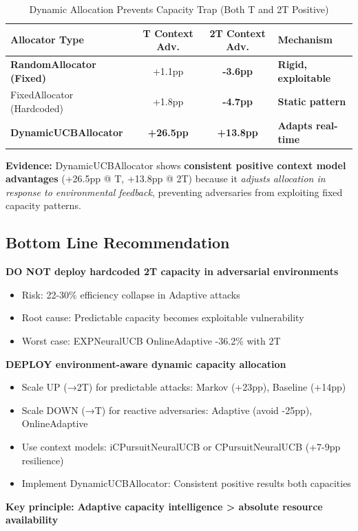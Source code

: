 \documentclass[11pt,a4paper]{article}
\newcommand{\critical}[1]{\textcolor{criticalcolor}{\textbf{#1}}}
\newcommand{\success}[1]{\textcolor{successcolor}{\textbf{#1}}}
\begin{document}
\vspace{-0.4cm}
\begin{table}[h]
\scriptsize
\centering
\begin{tabular}{lccl}
\toprule
\textbf{Allocator Type} & \textbf{T Context Adv.} & \textbf{2T Context Adv.} & \textbf{Mechanism} \\
\midrule
\critical{RandomAllocator (Fixed)} & +1.1pp & \critical{-3.6pp} & \critical{Rigid, exploitable} \\
FixedAllocator (Hardcoded) & +1.8pp & \critical{-4.7pp} & \critical{Static pattern} \\
\success{DynamicUCBAllocator} & \success{+26.5pp} & \success{+13.8pp} & \success{Adapts real-time} \\
\bottomrule
\end{tabular}
\vspace{-0.2cm}
\caption{Dynamic Allocation Prevents Capacity Trap (Both T and 2T Positive)}
\end{table}

\vspace{-0.2cm}
\textbf{Evidence:} DynamicUCBAllocator shows \success{consistent positive context model advantages} (+26.5pp @ T, +13.8pp @ 2T) because it \textit{adjusts allocation in response to environmental feedback}, preventing adversaries from exploiting fixed capacity patterns.

\subsection{Bottom Line Recommendation}

\begin{tcolorbox}
[colback=criticalcolor!10,colframe=criticalcolor,title=Critical Production Guidance]
\scriptsize
\textbf{DO NOT deploy hardcoded 2T capacity in adversarial environments}
\begin{itemize}
    \item Risk: 22-30\% efficiency collapse in Adaptive attacks
    \item Root cause: Predictable capacity becomes exploitable vulnerability
    \item Worst case: EXPNeuralUCB OnlineAdaptive -36.2\% with 2T
\end{itemize}

\textbf{DEPLOY environment-aware dynamic capacity allocation}
\begin{itemize}
    \item Scale UP (→2T) for predictable attacks: Markov (+23pp), Baseline (+14pp)
    \item Scale DOWN (→T) for reactive adversaries: Adaptive (avoid -25pp), OnlineAdaptive
    \item Use context models: iCPursuitNeuralUCB or CPursuitNeuralUCB (+7-9pp resilience)
    \item Implement DynamicUCBAllocator: Consistent positive results both capacities
\end{itemize}

\textbf{Key principle:} \success{Adaptive capacity intelligence > absolute resource availability}
\end{tcolorbox}
\end{document}
